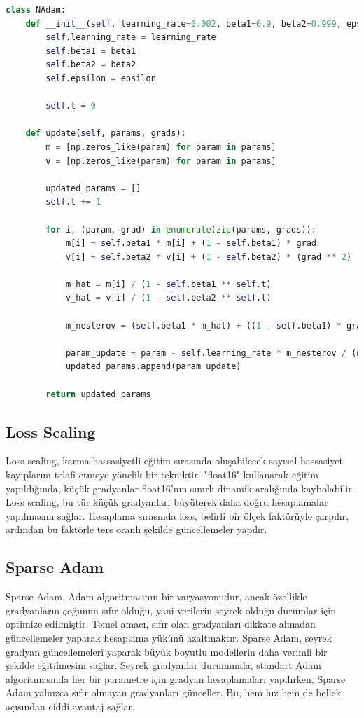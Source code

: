 \begin{lstlisting}[language=Python]
class NAdam:
    def __init__(self, learning_rate=0.002, beta1=0.9, beta2=0.999, epsilon=1e-8):
        self.learning_rate = learning_rate
        self.beta1 = beta1
        self.beta2 = beta2
        self.epsilon = epsilon

        self.t = 0

    def update(self, params, grads):
        m = [np.zeros_like(param) for param in params]
        v = [np.zeros_like(param) for param in params]

        updated_params = []
        self.t += 1

        for i, (param, grad) in enumerate(zip(params, grads)):
            m[i] = self.beta1 * m[i] + (1 - self.beta1) * grad
            v[i] = self.beta2 * v[i] + (1 - self.beta2) * (grad ** 2)

            m_hat = m[i] / (1 - self.beta1 ** self.t)
            v_hat = v[i] / (1 - self.beta2 ** self.t)

            m_nesterov = (self.beta1 * m_hat) + ((1 - self.beta1) * grad)

            param_update = param - self.learning_rate * m_nesterov / (np.sqrt(v_hat) + self.epsilon)
            updated_params.append(param_update)

        return updated_params
\end{lstlisting}

\newpage

\subsection{Loss Scaling}

Loss scaling, karma hassasiyetli eğitim sırasında oluşabilecek sayısal hassasiyet kayıplarını telafi etmeye yönelik bir tekniktir. "float16" kullanarak eğitim yapıldığında, küçük gradyanlar float16’nın sınırlı dinamik aralığında kaybolabilir. Loss scaling, bu tür küçük gradyanları büyüterek daha doğru hesaplamalar yapılmasını sağlar. Hesaplama sırasında loss, belirli bir ölçek faktörüyle çarpılır, ardından bu faktörle ters oranlı şekilde güncellemeler yapılır.

\newpage

\subsection{Sparse Adam}

Sparse Adam, Adam algoritmasının bir varyasyonudur, ancak özellikle gradyanların çoğunun sıfır olduğu, yani verilerin seyrek olduğu durumlar için optimize edilmiştir. Temel amacı, sıfır olan gradyanları dikkate almadan güncellemeler yaparak hesaplama yükünü azaltmaktır. Sparse Adam, seyrek gradyan güncellemeleri yaparak büyük boyutlu modellerin daha verimli bir şekilde eğitilmesini sağlar. Seyrek gradyanlar durumunda, standart Adam algoritmasında her bir parametre için gradyan hesaplamaları yapılırken, Sparse Adam yalnızca sıfır olmayan gradyanları günceller. Bu, hem hız hem de bellek açısından ciddi avantaj sağlar.

